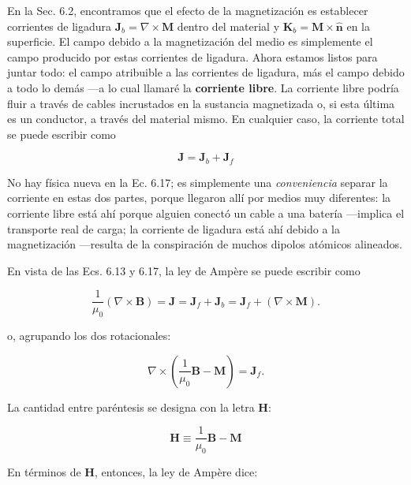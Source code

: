 \documentclass[12pt,a4paper]{report}
\newcommand{\esp}{\vspace{0.5cm}}
\begin{document}
	En la Sec. 6.2, encontramos que el efecto de la magnetización es establecer corrientes de ligadura $\mathbf{J}_b = \nabla \times \mathbf{M}$ dentro del material y $\mathbf{K}_b = \mathbf{M} \times \hat{\mathbf{n}}$ en la superficie. El campo debido a la magnetización del medio es simplemente el campo producido por estas corrientes de ligadura. Ahora estamos listos para juntar todo: el campo atribuible a las corrientes de ligadura, más el campo debido a todo lo demás —a lo cual llamaré la \textbf{corriente libre}. La corriente libre podría fluir a través de cables incrustados en la sustancia magnetizada o, si esta última es un conductor, a través del material mismo. En cualquier caso, la corriente total se puede escribir como
	
	\begin{equation}
		\mathbf{J} = \mathbf{J}_b + \mathbf{J}_f \tag{6.17}
	\end{equation}
	
	No hay física nueva en la Ec. 6.17; es simplemente una \textit{conveniencia} separar la corriente en estas dos partes, porque llegaron allí por medios muy diferentes: la corriente libre está ahí porque alguien conectó un cable a una batería —implica el transporte real de carga; la corriente de ligadura está ahí debido a la magnetización —resulta de la conspiración de muchos dipolos atómicos alineados.
	
	\esp
	
	En vista de las Ecs. 6.13 y 6.17, la ley de Ampère se puede escribir como
	
	\begin{equation*}
		\frac{1}{\mu_0} (\nabla \times \mathbf{B}) = \mathbf{J} = \mathbf{J}_f + \mathbf{J}_b = \mathbf{J}_f + (\nabla \times \mathbf{M}).
	\end{equation*}
	
	\noindent o, agrupando los dos rotacionales:
	
	\begin{equation*}
		\nabla \times \left( \frac{1}{\mu_0} \mathbf{B} - \mathbf{M} \right) = \mathbf{J}_f.
	\end{equation*}
	
	\noindent La cantidad entre paréntesis se designa con la letra $\mathbf{H}$:
	
	\begin{equation}
		\mathbf{H} \equiv \frac{1}{\mu_0} \mathbf{B} - \mathbf{M} \tag{6.18}
	\end{equation}
	
	\noindent En términos de $\mathbf{H}$, entonces, la ley de Ampère dice:
	
\end{document}
